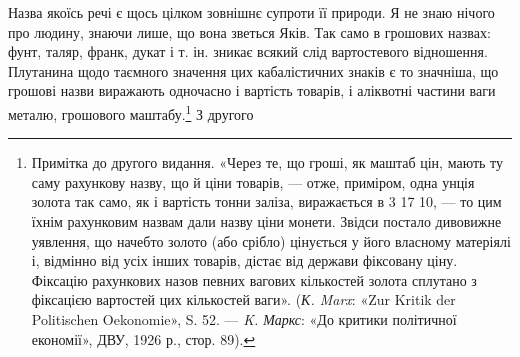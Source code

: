 Назва якоїсь речі є щось цілком зовнішнє супроти її природи.
Я не знаю нічого про людину, знаючи лише, що вона зветься
Яків. Так само в грошових назвах: фунт, таляр, франк, дукат
і т. ін. зникає всякий слід вартостевого відношення. Плутанина
щодо таємного значення цих кабалістичних знаків є то значніша,
що грошові назви виражають одночасно і вартість товарів,
і аліквотні частини ваги металю, грошового маштабу.\footnote{
Примітка до другого видання. «Через те, що гроші, як маштаб цін,
мають ту саму рахункову назву, що й ціни товарів, — отже, приміром,
одна унція золота так само, як і вартість тонни заліза, виражається в
3 17 10, — то цим їхнім рахунковим
назвам дали назву ціни монети. Звідси постало дивовижне уявлення, що
начебто золото (або срібло) цінується у його власному матеріялі і, відмінно
від усіх інших товарів, дістає від держави фіксовану ціну. Фіксацію
рахункових назов певних вагових кількостей золота сплутано з
фіксацією вартостей цих кількостей ваги». (\emph{К. Marx}: «Zur Kritik der
Politischen Oekonomie», S. 52. — \emph{K. Маркс}: «До критики політичної
економії», ДВУ, 1926 р., стор. 89).
} З другого
\parbreak{}  %
